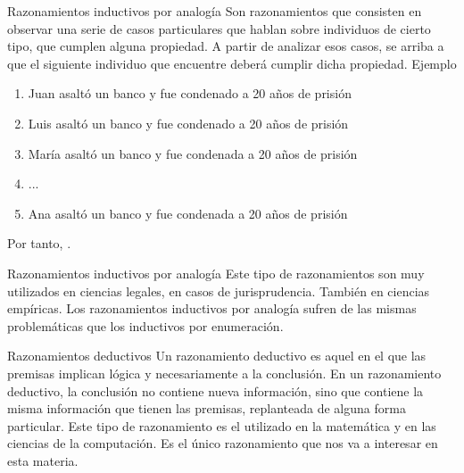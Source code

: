 \begin{frame}{Razonamientos inductivos por analogía}
  Son razonamientos que consisten en observar una serie de casos particulares
  que hablan sobre individuos de cierto tipo, que cumplen alguna propiedad.
  A partir de analizar esos casos, se arriba a que el siguiente individuo que
  encuentre deberá cumplir dicha propiedad.
  \jump
  Ejemplo
  \begin{enumerate}
    \item Juan asaltó un banco y fue condenado a 20 años de prisión
    \item Luis asaltó un banco y fue condenado a 20 años de prisión
    \item María asaltó un banco y fue condenada a 20 años de prisión
    \item ...
    \item Ana asaltó un banco y fue condenada a 20 años de prisión
  \end{enumerate}
  Por tanto, .
\end{frame}


\begin{frame}{Razonamientos inductivos por analogía}
  Este tipo de razonamientos son muy utilizados en ciencias legales, en casos
  de jurisprudencia. También en ciencias empíricas.
  \jump
  Los razonamientos inductivos por analogía sufren de las mismas problemáticas
  que los inductivos por enumeración.
  \jump
\end{frame}


\begin{frame}{Razonamientos deductivos}
  Un razonamiento deductivo es aquel en el que las premisas implican lógica y
  necesariamente a la conclusión.
  \jump
  \jump
  En un razonamiento deductivo, la conclusión no contiene nueva información,
  sino que contiene la misma información que tienen las premisas, replanteada
  de alguna forma particular.
  \jump
  Este tipo de razonamiento es el utilizado en la matemática y en las ciencias
  de la computación. Es el único razonamiento que nos va a interesar en esta
  materia.
\end{frame}

